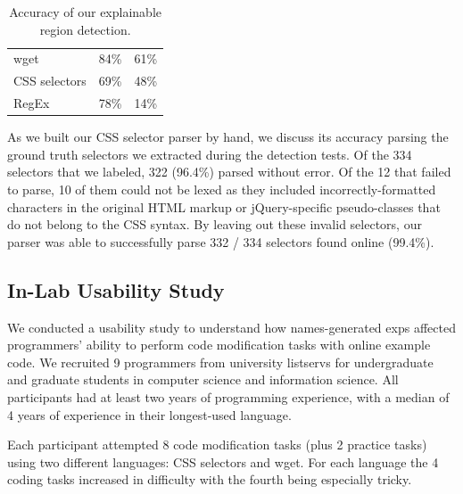 \begin{changes}
\begin{table}
\caption{Accuracy of our explainable region detection.}
\label{tab:detection_accuracy}
\centering
\begin{tabular}{llc}
\toprule
\headrow{Language} & \headrow{Precision} & \headrow{Recall} \\
\midrule
wget & 84\% & 61\% \\ \midrule
CSS selectors & 69\% & 48\% \\ \midrule
RegEx & 78\% & 14\% \\ \bottomrule
\end{tabular}
\end{table}
\fi

As we built our CSS selector parser by hand, we discuss its accuracy parsing the ground truth selectors we extracted during the detection tests.
Of the 334 selectors that we labeled, 322 (96.4\%) parsed without error.
Of the 12 that failed to parse, 10 of them could not be lexed as they included incorrectly-formatted characters in the original HTML markup or jQuery-specific pseudo-classes that do not belong to the CSS syntax.
By leaving out these invalid selectors, our parser was able to successfully parse 332 / 334 selectors found online (99.4\%).

\end{changes}

\subsection{In-Lab Usability Study}

We conducted a usability study to understand how \Glspl{name}-generated \glspl{exp} affected programmers' ability to perform code modification tasks with online example code.
We recruited 9 programmers from university listservs for undergraduate and graduate students in computer science and information science.
All participants had at least two years of programming experience, with a median of 4 years of experience in their longest-used language.

Each participant attempted 8 code modification tasks (plus 2 practice tasks) using two different languages: CSS selectors and wget.
For each language the 4 coding tasks increased in difficulty with the fourth being especially tricky.

